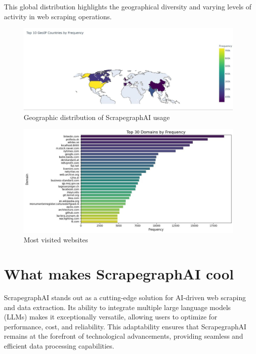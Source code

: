 This global distribution highlights the geographical diversity and varying levels of activity in web scraping operations.

\begin{figure}[h!]
    \centering
    \includegraphics[scale=0.25]{Assets/countries.jpg}
    \caption{Geographic distribution of ScrapegraphAI usage}
    \label{fig:geographic-distribution}
\end{figure}

\begin{figure}[h!]
    \centering
    \includegraphics[scale=0.45]{Assets/websites.jpg}
    \caption{Most visited websites}
    \label{fig:enter-label}
\end{figure}

\section{What makes ScrapegraphAI  cool}
ScrapegraphAI stands out as a cutting-edge solution for AI-driven web scraping and data extraction. Its ability to integrate multiple large language models (LLMs) makes it exceptionally versatile, allowing users to optimize for performance, cost, and reliability. This adaptability ensures that ScrapegraphAI remains at the forefront of technological advancements, providing seamless and efficient data processing capabilities.

